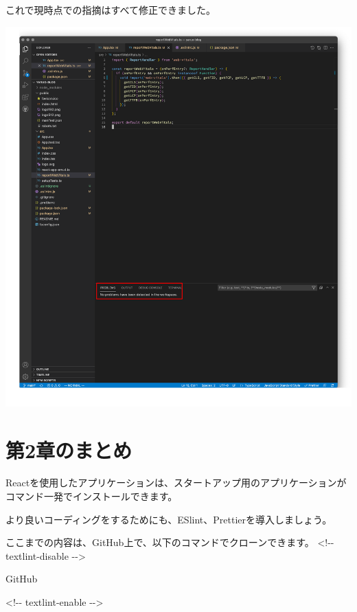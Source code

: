 これで現時点での指摘はすべて修正できました。

\begin{reviewimage}[H]%
\includegraphics[width=1.0\maxwidth]{./images/02-create-react-app/06_eslint_prettier_fixdoneAll.png}%
\label{image:02-create-react-app:06_eslint_prettier_fixdoneAll}
\end{reviewimage}

\section{第2章のまとめ}
\keeplastskip{
  \label{sec:2-6}
  \label{sec-chap02review}
  \par\nobreak
}

Reactを使用したアプリケーションは、スタートアップ用のアプリケーションがコマンド一発でインストールできます。

より良いコーディングをするためにも、ESlint、Prettierを導入しましょう。

\begin{starternote}[]{}

ここまでの内容は、GitHub上で、以下のコマンドでクローンできます。
\textless{}!{-}{-} textlint{-}disable {-}{-}\textgreater{}

\def\startercodeblockfontsize{}
\begin{starterterminal}[]{GitHub}\end{starterterminal}

\textless{}!{-}{-} textlint{-}enable {-}{-}\textgreater{}

\end{starternote}
